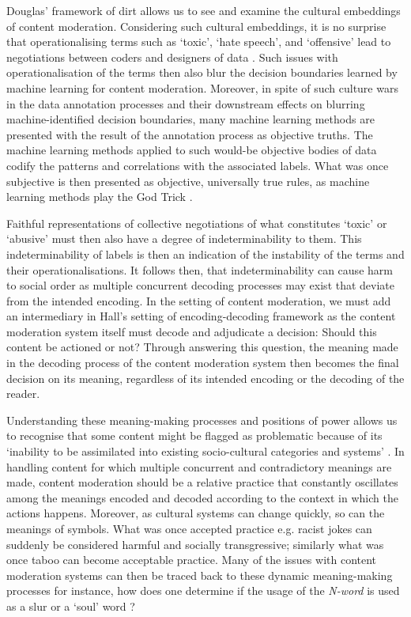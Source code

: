 Douglas' framework of dirt allows us to see and examine the cultural embeddings of content moderation. 
Considering such cultural embeddings, it is no surprise that operationalising terms such as `toxic', `hate speech', and `offensive' lead to negotiations between coders and designers of data \cite{Waseem:2016}. 
Such issues with operationalisation of the terms then also blur the decision boundaries learned by machine learning for content moderation. 
Moreover, in spite of such culture wars in the data annotation processes and their downstream effects on blurring machine-identified decision boundaries, many machine learning methods are presented with the result of the annotation process as objective truths. 
The machine learning methods applied to such would-be objective bodies of data codify the patterns and correlations with the associated labels. 
What was once subjective is then presented as objective, universally true rules, as machine learning methods play the God Trick \citep{Haraway:1988}.\vspace{5mm}

Faithful representations of collective negotiations of what constitutes `toxic' or `abusive' must then also have a degree of indeterminability to them. 
This indeterminability of labels is then an indication of the instability of the terms and their operationalisations. 
It follows then, that indeterminability can cause harm to social order \cite{Hall:floating:1997} as multiple concurrent decoding processes may exist that deviate from the intended encoding. 
In the setting of content moderation, we must add an intermediary in Hall's \cite{Hall:1997} setting of encoding-decoding framework as the content moderation system itself must decode and adjudicate a decision: Should this content be actioned or not? 
Through answering this question, the meaning made in the decoding process of the content moderation system then becomes the final decision on its meaning, regardless of its intended encoding or the decoding of the reader.

Understanding these meaning-making processes and positions of power allows us to recognise that some content might be flagged as problematic because of its `inability to be assimilated into existing socio-cultural categories and systems' \cite{Rafi:2019}. 
In handling content for which multiple concurrent and contradictory meanings are made, content moderation should be a relative practice that constantly oscillates among the meanings encoded and decoded according to the context in which the actions happens. 
Moreover, as cultural systems can change quickly, so can the meanings of symbols. 
What was once accepted practice e.g. racist jokes can suddenly be considered harmful and socially transgressive; similarly what was once taboo can become acceptable practice.
Many of the issues with content moderation systems can then be traced back to these dynamic meaning-making processes for instance, how does one determine if the usage of the \textit{N-word} is used as a slur or a `soul' word \cite{Rahman:2012}?\vspace{5mm}

